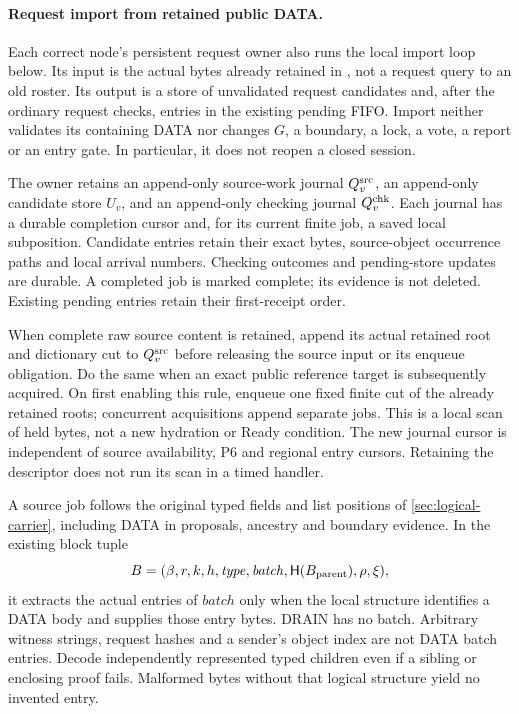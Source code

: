 \paragraph{Request import from retained public DATA.}
\label{sec:public-request-import}
Each correct node's persistent request owner also runs the local import
loop below. Its input is the actual bytes already retained in
, not a request query to an old roster. Its output is
a store of unvalidated request candidates and, after the ordinary
request checks, entries in the existing pending FIFO. Import neither
validates its containing DATA nor changes $G$, a boundary, a lock, a
vote, a report or an entry gate. In particular, it does not reopen a
closed session.

The owner retains an append-only source-work journal $Q^{\rm src}_v$,
an append-only candidate store $U_v$, and an append-only checking journal
$Q^{\rm chk}_v$. Each journal has a durable completion cursor and, for
its current finite job, a saved local subposition. Candidate entries
retain their exact bytes, source-object occurrence paths and local
arrival numbers. Checking outcomes and pending-store updates are
durable. A completed job is marked complete; its evidence is not
deleted. Existing pending entries retain their first-receipt order.

When complete raw source content is retained, append its actual retained
root and dictionary cut to $Q^{\rm src}_v$ before releasing the source
input or its enqueue obligation. Do the same when an exact public
reference target is subsequently acquired. On first enabling this rule,
enqueue one fixed finite cut of the already retained roots; concurrent
acquisitions append separate jobs. This is a local scan of held bytes,
not a new hydration or Ready condition. The new journal cursor is
independent of source availability, P6 and regional entry cursors.
Retaining the descriptor does not run its scan in a timed handler.

A source job follows the original typed fields and list positions of
\cref{sec:logical-carrier}, including DATA in proposals, ancestry and
boundary evidence. In the existing block tuple
\[
 B=(\beta,r,k,h,\mathit{type},\mathit{batch},
          \mathsf H(B_{\rm parent}),\rho,\xi),
\]
it extracts the actual entries of $\mathit{batch}$ only when the local
structure identifies a DATA body and supplies those entry bytes.
DRAIN has no batch. Arbitrary witness strings, request hashes and a
sender's object index are not DATA batch entries. Decode independently
represented typed children even if a sibling or enclosing proof fails.
Malformed bytes without that logical structure yield no invented entry.

